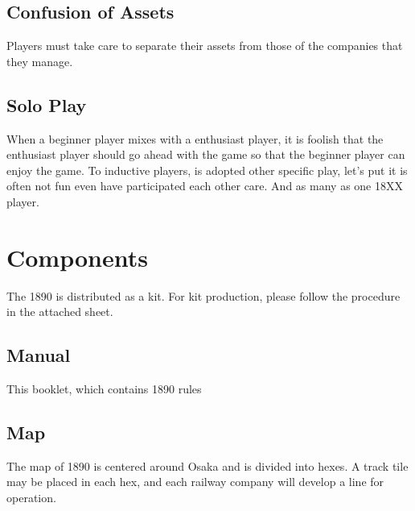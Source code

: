 \documentclass{article}
\begin{document}
\begin{CJK}{UTF8}{min}
\begin{multicols}{2}
\subsection{Confusion of Assets}
Players must take care to separate their assets from those of the
companies that they manage.


\subsection{Solo Play}
When a beginner player mixes with a enthusiast player, it is foolish
that the enthusiast player should go ahead with the game so that the
 beginner player can enjoy the game. To inductive players, is adopted
other specific play, let's put it is often not fun even have
participated each other care. And as many as one 18XX player.

\section{Components}
The 1890 is distributed as a kit. For kit production, please follow
the procedure in the attached sheet.

\subsection{Manual}
This booklet, which contains 1890 rules

\subsection{Map}
The map of 1890 is centered around Osaka and is divided into
hexes. A track tile may be placed in each hex, and each
railway company will develop a line for operation.


\end{multicols}
\end{CJK}
\end{document}
